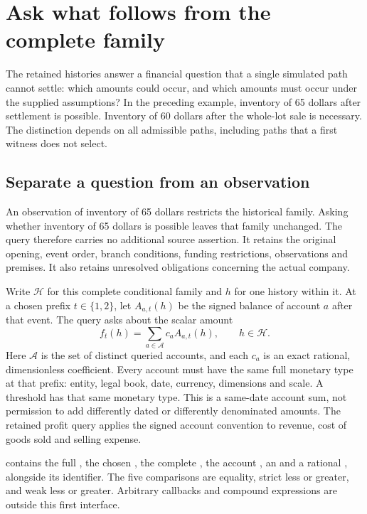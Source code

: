 \section{Ask what follows from the complete family}
\label{sec:family-outcome-queries}

The retained histories answer a financial question that a single simulated
path cannot settle: which amounts could occur, and which amounts must occur
under the supplied assumptions? In the preceding example, inventory of
65 dollars after settlement is possible. Inventory of 60 dollars after the
whole-lot sale is necessary. The distinction depends on all admissible paths,
including paths that a first witness does not select.

\subsection{Separate a question from an observation}

An observation of inventory of 65 dollars restricts the historical family. Asking whether
inventory of 65 dollars is possible leaves that family unchanged. The query therefore
carries no additional source assertion. It retains the original opening,
event order, branch conditions, funding restrictions, observations and premises.
It also retains unresolved obligations concerning the actual company.

Write \(\mathcal H\) for this complete conditional family and \(h\) for one
history within it. At a chosen prefix \(t\in\{1,2\}\), let
\(A_{a,t}(h)\) be the signed balance of account \(a\) after that event.
The query asks about the scalar amount
\begin{equation}
\label{eq:family-outcome-amount}
 f_t(h)=\sum_{a\in\mathcal A}c_a A_{a,t}(h),
 \qquad h\in\mathcal H.
\end{equation}
Here \(\mathcal A\) is the set of distinct queried accounts, and each
\(c_a\) is an exact rational, dimensionless coefficient. Every account must
have the same full monetary type at that prefix: entity, legal book, date,
currency, dimensions and scale. A threshold has that same monetary type.
This is a same-date account sum, not permission to add differently dated or
differently denominated amounts. The retained profit query applies the signed
account convention to revenue, cost of goods sold and selling expense.

 contains the full , the chosen
, the complete , the account , an
 and a rational , alongside its 
identifier. The five comparisons are equality, strict less or greater, and
weak less or greater. Arbitrary callbacks and compound expressions are outside
this first interface.


